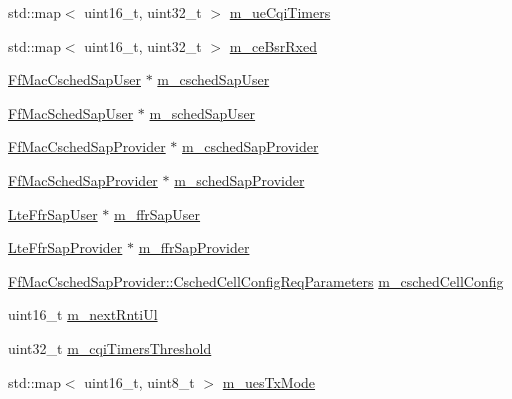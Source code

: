 \begin{DoxyCompactItemize}
\item 
std\+::map$<$ uint16\+\_\+t, uint32\+\_\+t $>$ \hyperlink{classns3_1_1TdTbfqFfMacScheduler_abc6132bce28b1ee650503bf3144eb22a}{m\+\_\+ue\+Cqi\+Timers}
\item 
std\+::map$<$ uint16\+\_\+t, uint32\+\_\+t $>$ \hyperlink{classns3_1_1TdTbfqFfMacScheduler_ab399ba0c15f9cd1688fb044cf915deb7}{m\+\_\+ce\+Bsr\+Rxed}
\item 
\hyperlink{classns3_1_1FfMacCschedSapUser}{Ff\+Mac\+Csched\+Sap\+User} $\ast$ \hyperlink{classns3_1_1TdTbfqFfMacScheduler_a6e8b2fe6e59a2f53e5925eb4e07f4188}{m\+\_\+csched\+Sap\+User}
\item 
\hyperlink{classns3_1_1FfMacSchedSapUser}{Ff\+Mac\+Sched\+Sap\+User} $\ast$ \hyperlink{classns3_1_1TdTbfqFfMacScheduler_a8f5689c5d8af1b40e97dacfce14f605a}{m\+\_\+sched\+Sap\+User}
\item 
\hyperlink{classns3_1_1FfMacCschedSapProvider}{Ff\+Mac\+Csched\+Sap\+Provider} $\ast$ \hyperlink{classns3_1_1TdTbfqFfMacScheduler_a22a19059921cf652fbce916ceca70972}{m\+\_\+csched\+Sap\+Provider}
\item 
\hyperlink{classns3_1_1FfMacSchedSapProvider}{Ff\+Mac\+Sched\+Sap\+Provider} $\ast$ \hyperlink{classns3_1_1TdTbfqFfMacScheduler_afeed1dc1600c32b8ecc7c1b4f805ca12}{m\+\_\+sched\+Sap\+Provider}
\item 
\hyperlink{classns3_1_1LteFfrSapUser}{Lte\+Ffr\+Sap\+User} $\ast$ \hyperlink{classns3_1_1TdTbfqFfMacScheduler_aa78fad6d52a8781e7ed2a51a75ae61b9}{m\+\_\+ffr\+Sap\+User}
\item 
\hyperlink{classns3_1_1LteFfrSapProvider}{Lte\+Ffr\+Sap\+Provider} $\ast$ \hyperlink{classns3_1_1TdTbfqFfMacScheduler_a9db8ce15b6803fe859e5c2908cd00e14}{m\+\_\+ffr\+Sap\+Provider}
\item 
\hyperlink{structns3_1_1FfMacCschedSapProvider_1_1CschedCellConfigReqParameters}{Ff\+Mac\+Csched\+Sap\+Provider\+::\+Csched\+Cell\+Config\+Req\+Parameters} \hyperlink{classns3_1_1TdTbfqFfMacScheduler_a3ac3e4b1b3818ff204d6ff6c89c19f4d}{m\+\_\+csched\+Cell\+Config}
\item 
uint16\+\_\+t \hyperlink{classns3_1_1TdTbfqFfMacScheduler_a01649b4140890dd7adb19d752be0a6ff}{m\+\_\+next\+Rnti\+Ul}
\item 
uint32\+\_\+t \hyperlink{classns3_1_1TdTbfqFfMacScheduler_a4a154b47a91bb301ab183ce57e44c431}{m\+\_\+cqi\+Timers\+Threshold}
\item 
std\+::map$<$ uint16\+\_\+t, uint8\+\_\+t $>$ \hyperlink{classns3_1_1TdTbfqFfMacScheduler_a81895414769458c1204040d901d7bba7}{m\+\_\+ues\+Tx\+Mode}

\end{DoxyCompactItemize}

